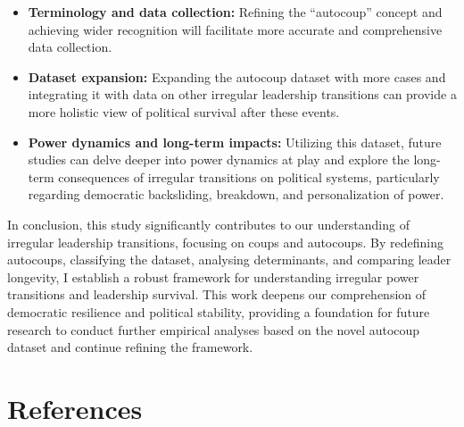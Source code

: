 \documentclass[
  12pt,
]{report}
\begin{document}
\begin{itemize}
\item
  \textbf{Terminology and data collection:} Refining the ``autocoup''
  concept and achieving wider recognition will facilitate more accurate
  and comprehensive data collection.
\item
  \textbf{Dataset expansion:} Expanding the autocoup dataset with more
  cases and integrating it with data on other irregular leadership
  transitions can provide a more holistic view of political survival
  after these events.
\item
  \textbf{Power dynamics and long-term impacts:} Utilizing this dataset,
  future studies can delve deeper into power dynamics at play and
  explore the long-term consequences of irregular transitions on
  political systems, particularly regarding democratic backsliding,
  breakdown, and personalization of power.
\end{itemize}

In conclusion, this study significantly contributes to our understanding
of irregular leadership transitions, focusing on coups and autocoups. By
redefining autocoups, classifying the dataset, analysing determinants,
and comparing leader longevity, I establish a robust framework for
understanding irregular power transitions and leadership survival. This
work deepens our comprehension of democratic resilience and political
stability, providing a foundation for future research to conduct further
empirical analyses based on the novel autocoup dataset and continue
refining the framework.

\chapter*{References}\label{references}
\end{document}
